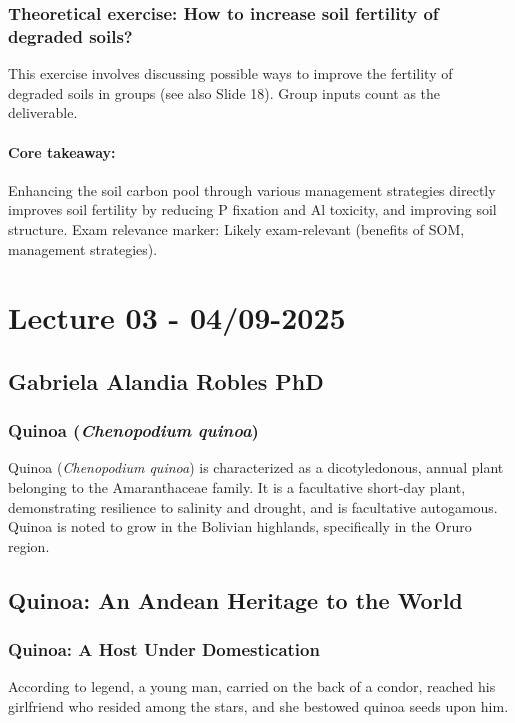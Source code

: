 \subsubsection*{Theoretical exercise: How to increase soil fertility of degraded soils?} 
This exercise involves discussing possible ways to improve the fertility of degraded soils in groups (see also Slide 18). Group inputs count as the deliverable.

\paragraph*{Core takeaway:} 
Enhancing the soil carbon pool through various management strategies directly improves soil fertility by reducing P fixation and Al toxicity, and improving soil structure. Exam relevance marker: Likely exam-relevant (benefits of SOM, management strategies).

\section{Lecture 03 - 04/09-2025}


\subsection{Gabriela Alandia Robles PhD} 
\subsubsection*{Quinoa (\textit{Chenopodium quinoa})} 
Quinoa (\textit{Chenopodium quinoa}) is characterized as a dicotyledonous, annual plant belonging to the Amaranthaceae family. It is a facultative short-day plant, demonstrating resilience to salinity and drought, and is facultative autogamous. Quinoa is noted to grow in the Bolivian highlands, specifically in the Oruro region.
\subsection{Quinoa: An Andean Heritage to the World} 

\subsubsection*{Quinoa: A Host Under Domestication} 
According to legend, a young man, carried on the back of a condor, reached his girlfriend who resided among the stars, and she bestowed quinoa seeds upon him.


